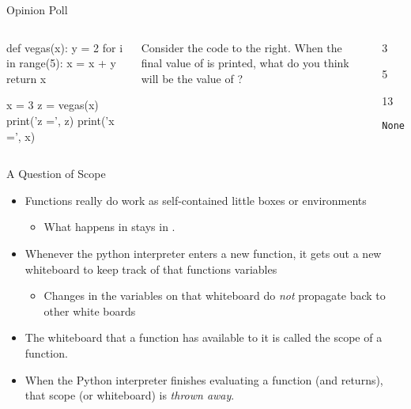 \documentclass[pdf, aspectratio=169, 12pt]{beamer}
\begin{document}
\begin{frame}[fragile]{Opinion Poll}
	\begin{columns}
		\begin{pythoncode}
			def vegas(x):
				y = 2
				for i in range(5):
					x = x + y
				return x

			x = 3
			z = vegas(x)
			print('z =', z)
			print('x =', x)
		\end{pythoncode}
		
		Consider the code to the right. When the final value of  is printed, what do you think will be the value of ?
		\begin{poll}
		\item 3
		\item 5
		\item 13
		\item \texttt{None}
		\end{poll}
	\end{columns}
\end{frame}

\begin{frame}{A Question of Scope}
	\begin{itemize}
		\item Functions really do work as self-contained little boxes or environments
			\begin{itemize}
				\item What happens in \pyi{vegas} stays in .
			\end{itemize}
		\item Whenever the python interpreter enters a new function, it gets out a new whiteboard to keep track of that functions variables
			\begin{itemize}
				\item Changes in the variables on that whiteboard do \emph{not} propagate back to other white boards
			\end{itemize}
		\item The whiteboard that a function has available to it is called the \alert{scope} of a function.
		\item When the Python interpreter finishes evaluating a function (and returns), that scope (or whiteboard) is \emph{thrown away}.
	\end{itemize}
\end{frame}
\end{document}
